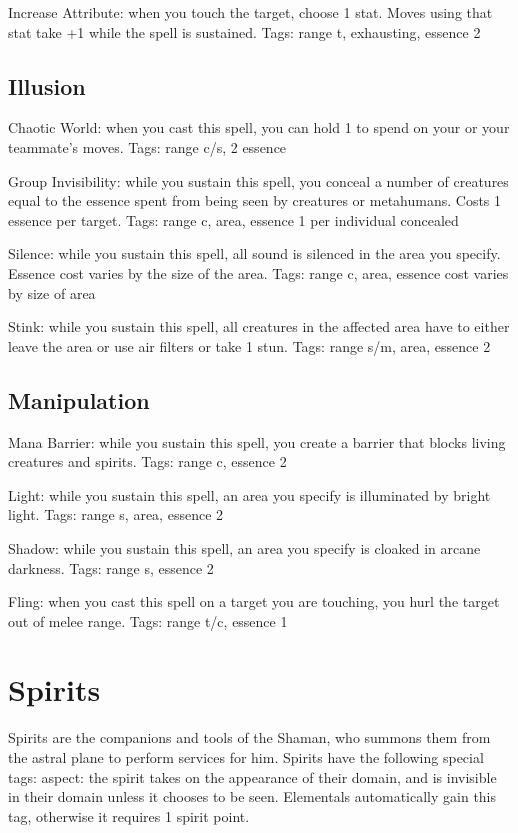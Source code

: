 Increase Attribute: when you touch the target, choose 1 stat. Moves using that stat take +1 while the spell is sustained. Tags: range t, exhausting, essence 2


\subsection{Illusion}
Chaotic World: when you cast this spell, you can hold 1 to spend on your or your teammate’s moves. Tags: range c/s, 2 essence

Group Invisibility: while you sustain this spell, you conceal a number of creatures equal to the essence spent from being seen by creatures or metahumans. Costs 1 essence per target. Tags: range c, area, essence 1 per individual concealed

Silence: while you sustain this spell, all sound is silenced in the area you specify. Essence cost varies by the size of the area. Tags: range c, area, essence cost varies by size of area

Stink: while you sustain this spell, all creatures in the affected area have to either leave the area or use air filters or take 1 stun. Tags: range s/m, area, essence 2


\subsection{Manipulation}
Mana Barrier: while you sustain this spell, you create a barrier that blocks living creatures and spirits. Tags: range c, essence 2

Light: while you sustain this spell, an area you specify is illuminated by bright light. Tags: range s, area, essence 2

Shadow: while you sustain this spell, an area you specify is cloaked in arcane darkness. Tags: range s, essence 2

Fling: when you cast this spell on a target you are touching, you hurl the target out of melee range. Tags: range t/c, essence 1



\section{Spirits}

Spirits are the companions and tools of the Shaman, who summons them from the astral plane to perform services for him. Spirits have the following special tags: aspect: the spirit takes on the appearance of their domain, and is invisible in their domain unless it chooses to be seen. Elementals automatically gain this tag, otherwise it requires 1 spirit point.

